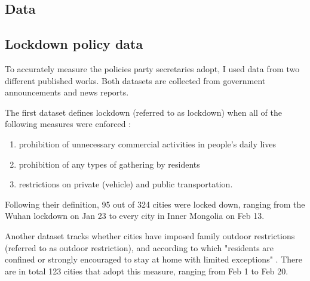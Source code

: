 \documentclass{article}
\begin{document}
\begin{CJK}{UTF8}{gbsn}




\section{Data}

\subsection{Lockdown policy data} 

To accurately measure the policies party secretaries adopt, I used data from two different published works. Both datasets are collected from government announcements and news reports. 

The first dataset defines lockdown (referred to as lockdown) when all of the following measures were enforced \cite{yuhang}:

\begin{enumerate}
  \item prohibition of unnecessary commercial activities in people’s daily lives
  \item prohibition of any types of gathering by residents
  \item restrictions on private (vehicle) and public transportation. 
\end{enumerate}
Following their definition, 95 out of 324 cities were locked down, ranging from the Wuhan lockdown on Jan 23 to every city in Inner Mongolia on Feb 13. 


Another dataset tracks whether cities have imposed family outdoor restrictions (referred to as outdoor restriction), and according to which "residents are confined or strongly encouraged to stay at home with limited exceptions" \cite{xichen}. There are in total 123 cities that adopt this measure, ranging from Feb 1 to Feb 20. 


\end{CJK}
\end{document}
